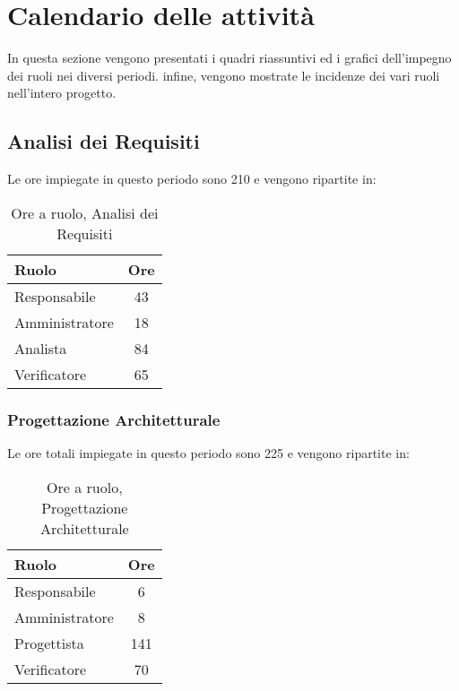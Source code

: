 \section{Calendario delle attività}
In questa sezione vengono presentati i quadri riassuntivi ed i grafici dell'impegno dei ruoli nei diversi periodi. infine, vengono mostrate le incidenze dei vari ruoli nell'intero progetto.
\subsection{Analisi dei Requisiti}
Le ore impiegate in questo periodo sono 210 e vengono ripartite in:
\begin{table}[H]
	\begin{center}
		\begin{tabular}{|l|c|}
			\hline
			\textbf{Ruolo}	& \textbf{Ore} \\
			\hline
			Responsabile	&	43	\\
			\hline
			Amministratore	&	18	\\
			\hline
			Analista		&	84	\\
			\hline
			Verificatore	&	65	\\
			\hline
		\end{tabular}
	\end{center}
	\caption{Ore a ruolo, Analisi dei Requisiti}
\end{table}



\subsubsection{Progettazione Architetturale}
Le ore totali impiegate in questo periodo sono 225 e vengono ripartite in:
\begin{table}[H]
	\begin{center}
		\begin{tabular}{|l|c|}
			\hline
			\textbf{Ruolo}	& \textbf{Ore} \\
			\hline
			Responsabile	&	6	\\
			\hline
			Amministratore	&	8	\\
			\hline
			Progettista		&	141	\\
			\hline
			Verificatore	&	70	\\
			\hline
		\end{tabular}
	\end{center}
	\caption{Ore a ruolo, Progettazione Architetturale}
\end{table}
